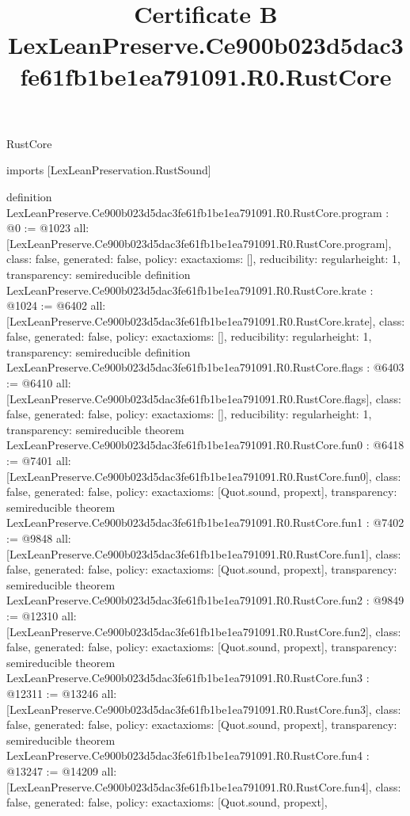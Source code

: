 \begin{lexlean}{RustCore}
\title{Certificate B LexLeanPreserve.Ce900b023d5dac3fe61fb1be1ea791091.R0.RustCore}
\begin{coremodule}
imports [LexLeanPreservation.RustSound]

definition LexLeanPreserve.Ce900b023d5dac3fe61fb1be1ea791091.R0.RustCore.program : @0 := @1023 {
  all: [LexLeanPreserve.Ce900b023d5dac3fe61fb1be1ea791091.R0.RustCore.program],
  class: false,
  generated: false,
  policy: exact{axioms: []},
  reducibility: regular{height: 1},
  transparency: semireducible
}
definition LexLeanPreserve.Ce900b023d5dac3fe61fb1be1ea791091.R0.RustCore.krate : @1024 := @6402 {
  all: [LexLeanPreserve.Ce900b023d5dac3fe61fb1be1ea791091.R0.RustCore.krate],
  class: false,
  generated: false,
  policy: exact{axioms: []},
  reducibility: regular{height: 1},
  transparency: semireducible
}
definition LexLeanPreserve.Ce900b023d5dac3fe61fb1be1ea791091.R0.RustCore.flags : @6403 := @6410 {
  all: [LexLeanPreserve.Ce900b023d5dac3fe61fb1be1ea791091.R0.RustCore.flags],
  class: false,
  generated: false,
  policy: exact{axioms: []},
  reducibility: regular{height: 1},
  transparency: semireducible
}
theorem LexLeanPreserve.Ce900b023d5dac3fe61fb1be1ea791091.R0.RustCore.fun0 : @6418 := @7401 {
  all: [LexLeanPreserve.Ce900b023d5dac3fe61fb1be1ea791091.R0.RustCore.fun0],
  class: false,
  generated: false,
  policy: exact{axioms: [Quot.sound, propext]},
  transparency: semireducible
}
theorem LexLeanPreserve.Ce900b023d5dac3fe61fb1be1ea791091.R0.RustCore.fun1 : @7402 := @9848 {
  all: [LexLeanPreserve.Ce900b023d5dac3fe61fb1be1ea791091.R0.RustCore.fun1],
  class: false,
  generated: false,
  policy: exact{axioms: [Quot.sound, propext]},
  transparency: semireducible
}
theorem LexLeanPreserve.Ce900b023d5dac3fe61fb1be1ea791091.R0.RustCore.fun2 : @9849 := @12310 {
  all: [LexLeanPreserve.Ce900b023d5dac3fe61fb1be1ea791091.R0.RustCore.fun2],
  class: false,
  generated: false,
  policy: exact{axioms: [Quot.sound, propext]},
  transparency: semireducible
}
theorem LexLeanPreserve.Ce900b023d5dac3fe61fb1be1ea791091.R0.RustCore.fun3 : @12311 := @13246 {
  all: [LexLeanPreserve.Ce900b023d5dac3fe61fb1be1ea791091.R0.RustCore.fun3],
  class: false,
  generated: false,
  policy: exact{axioms: [Quot.sound, propext]},
  transparency: semireducible
}
theorem LexLeanPreserve.Ce900b023d5dac3fe61fb1be1ea791091.R0.RustCore.fun4 : @13247 := @14209 {
  all: [LexLeanPreserve.Ce900b023d5dac3fe61fb1be1ea791091.R0.RustCore.fun4],
  class: false,
  generated: false,
  policy: exact{axioms: [Quot.sound, propext]},
}
\end{coremodule}
\end{lexlean}
